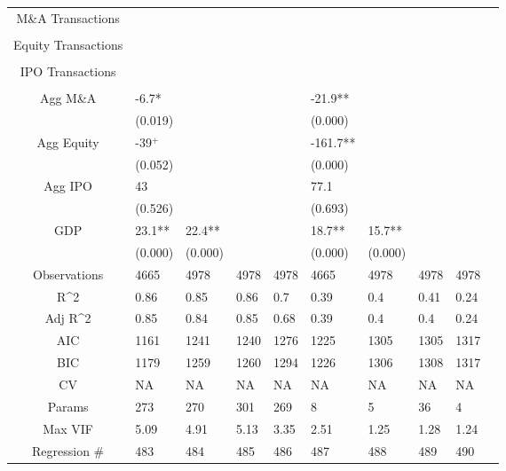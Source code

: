 \documentclass{article}
\begin{document}
\begin{table}[H]
\begin{tabular}{|clllllllll|}
  M\&A Transactions &  &  &  &  &  &  &  &  & \\ 
   &  &  &  &  &  &  &  &  & \\ 
  Equity Transactions &  &  &  &  &  &  &  &  & \\ 
   &  &  &  &  &  &  &  &  & \\ 
  IPO Transactions &  &  &  &  &  &  &  &  & \\ 
   &  &  &  &  &  &  &  &  & \\ 
  Agg M\&A & -6.7* &  &  &  & -21.9** &  &  &  & \\ 
   & (0.019) &  &  &  & (0.000) &  &  &  & \\ 
  Agg Equity & -39$^{+}$ &  &  &  & -161.7** &  &  &  & \\ 
   & (0.052) &  &  &  & (0.000) &  &  &  & \\ 
  Agg IPO & 43 &  &  &  & 77.1 &  &  &  & \\ 
   & (0.526) &  &  &  & (0.693) &  &  &  & \\ 
  GDP & 23.1** & 22.4** &  &  & 18.7** & 15.7** &  &  & \\ 
   & (0.000) & (0.000) &  &  & (0.000) & (0.000) &  &  & \\ 
  \hline 
 Observations & 4665 & 4978 & 4978 & 4978 & 4665 & 4978 & 4978 & 4978 & \\ 
  R^2 & 0.86 & 0.85 & 0.86 & 0.7 & 0.39 & 0.4 & 0.41 & 0.24 & \\ 
  Adj R^2 & 0.85 & 0.84 & 0.85 & 0.68 & 0.39 & 0.4 & 0.4 & 0.24 & \\ 
  AIC & 1161 & 1241 & 1240 & 1276 & 1225 & 1305 & 1305 & 1317 & \\ 
  BIC & 1179 & 1259 & 1260 & 1294 & 1226 & 1306 & 1308 & 1317 & \\ 
  CV & NA & NA & NA & NA & NA & NA & NA & NA & \\ 
  Params & 273 & 270 & 301 & 269 & 8 & 5 & 36 & 4 & \\ 
  Max VIF & 5.09 & 4.91 & 5.13 & 3.35 & 2.51 & 1.25 & 1.28 & 1.24 & \\ 
  Regression \# & 483 & 484 & 485 & 486 & 487 & 488 & 489 & 490 & \\ 
   \hline
\end{tabular}
 
\end{table}
\end{document}
